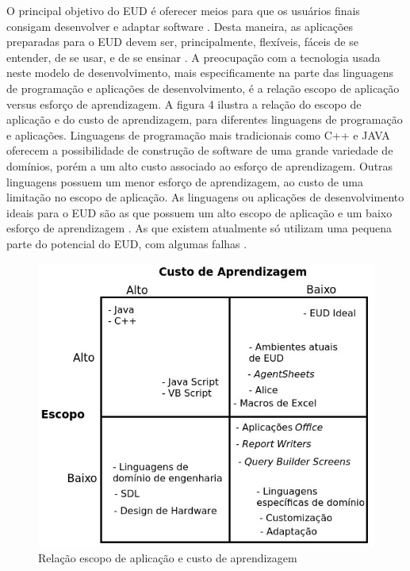 O principal objetivo do EUD é oferecer meios para que os usuários finais consigam desenvolver e adaptar software \cite{lieberman2006}. Desta maneira, as aplicações preparadas para o EUD devem ser, principalmente, flexíveis, fáceis de se entender, de se usar, e de se ensinar \cite{lieberman2006}. A preocupação com a tecnologia usada neste modelo de desenvolvimento, mais especificamente na parte das linguagens de programação e aplicações de desenvolvimento, é a relação escopo de aplicação versus esforço de aprendizagem. A figura 4 ilustra a relação do escopo de aplicação e do custo de aprendizagem, para diferentes linguagens de programação e aplicações. Linguagens de programação mais tradicionais como C++ e JAVA oferecem a possibilidade de construção de software de uma grande variedade de domínios, porém a um alto custo associado ao esforço de aprendizagem. Outras linguagens possuem um menor esforço de aprendizagem, ao custo de uma limitação no escopo de aplicação. As linguagens ou aplicações de desenvolvimento ideais para o EUD são as que possuem um alto escopo de aplicação e um baixo esforço de aprendizagem \cite{fischer2004}. As que existem atualmente só utilizam uma pequena parte do potencial do EUD, com algumas falhas \cite{paterno2013}.

\begin{figure}[h]
	\centering
	\label{fig01}
		\includegraphics[scale=0.8]{figuras/trade_off_eud_editado}
	\caption{Relação escopo de aplicação e custo de aprendizagem}
\end{figure}
\pagebreak


